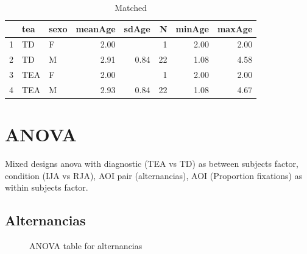 \documentclass{article}
\begin{document}
\begin{table}[ht]
\caption{Matched}
\centering
\begin{tabular}{rllrrrrr}
  \hline
 & tea & sexo & meanAge & sdAge & N & minAge & maxAge \\ 
  \hline
1 & TD & F & 2.00 &  &   1 & 2.00 & 2.00 \\ 
  2 & TD & M & 2.91 & 0.84 &  22 & 1.08 & 4.58 \\ 
  3 & TEA & F & 2.00 &  &   1 & 2.00 & 2.00 \\ 
  4 & TEA & M & 2.93 & 0.84 &  22 & 1.08 & 4.67 \\ 
   \hline
\end{tabular}
\end{table}


\section{ANOVA}

Mixed designs anova with diagnostic (TEA vs TD) as between subjects factor, condition (IJA vs RJA), AOI pair (alternancias), AOI (Proportion fixations) as within subjects factor.

\subsection{Alternancias}

\begin{figure}[H]
  \caption{ANOVA table for alternancias}
  \noindent{}
  \centering
\end{figure}
\end{document}
